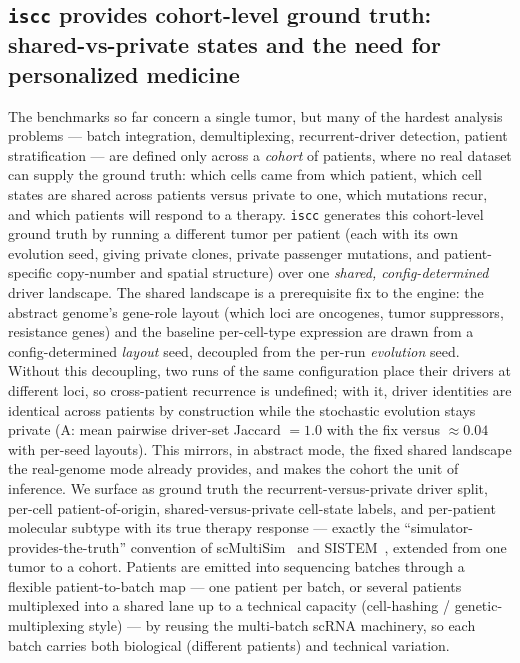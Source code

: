 \documentclass{article}
\begin{document}
\subsection{\texttt{iscc} provides cohort-level ground truth: shared-vs-private states and the need for personalized medicine}
\label{sec:cohort}
The benchmarks so far concern a single tumor, but many of the hardest analysis problems --- batch
integration, demultiplexing, recurrent-driver detection, patient stratification --- are defined only
across a \emph{cohort} of patients, where no real dataset can supply the ground truth: which cells came
from which patient, which cell states are shared across patients versus private to one, which mutations
recur, and which patients will respond to a therapy. \texttt{iscc} generates this cohort-level ground
truth by running a different tumor per patient (each with its own evolution seed, giving private
clones, private passenger mutations, and patient-specific copy-number and spatial structure) over one
\emph{shared, config-determined} driver landscape. The shared landscape is a prerequisite fix to the
engine: the abstract genome's gene-role layout (which loci are oncogenes, tumor suppressors, resistance
genes) and the baseline per-cell-type expression are drawn from a config-determined \emph{layout} seed,
decoupled from the per-run \emph{evolution} seed. Without this decoupling, two runs of the same
configuration place their drivers at different loci, so cross-patient recurrence is undefined; with it,
driver identities are identical across patients by construction while the stochastic evolution stays
private (A: mean pairwise driver-set Jaccard $=1.0$ with the fix versus $\approx0.04$
with per-seed layouts). This mirrors, in abstract mode, the fixed shared landscape the real-genome
mode already provides, and makes the cohort the unit of inference. We surface as ground truth the
recurrent-versus-private driver split, per-cell patient-of-origin, shared-versus-private cell-state
labels, and per-patient molecular subtype with its true therapy response --- exactly the
``simulator-provides-the-truth'' convention of scMultiSim~\cite{li_scmultisim_2025} and
SISTEM~\cite{weiner_sistem_2025}, extended from one tumor to a cohort. Patients are emitted into
sequencing batches through a flexible patient-to-batch map --- one patient per batch, or several
patients multiplexed into a shared lane up to a technical capacity (cell-hashing / genetic-multiplexing
style) --- by reusing the multi-batch scRNA machinery, so each batch carries both biological (different
patients) and technical variation.
\end{document}
